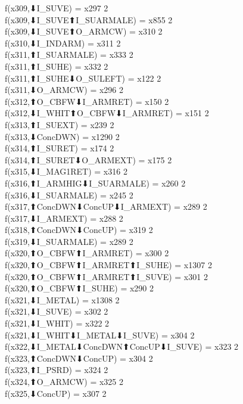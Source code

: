 f(x309,⬇I_SUVE) = x297 {2} \\
f(x309,⬇I_SUVE⬆I_SUARMALE) = x855 {2} \\
f(x309,⬇I_SUVE⬆O_ARMCW) = x310 {2} \\
f(x310,⬇I_INDARM) = x311 {2} \\
f(x311,⬆I_SUARMALE) = x333 {2} \\
f(x311,⬆I_SUHE) = x332 {2} \\
f(x311,⬆I_SUHE⬇O_SULEFT) = x122 {2} \\
f(x311,⬇O_ARMCW) = x296 {2} \\
f(x312,⬆O_CBFW⬇I_ARMRET) = x150 {2} \\
f(x312,⬇I_WHIT⬆O_CBFW⬇I_ARMRET) = x151 {2} \\
f(x313,⬆I_SUEXT) = x239 {2} \\
f(x313,⬇ConcDWN) = x1290 {2} \\
f(x314,⬆I_SURET) = x174 {2} \\
f(x314,⬆I_SURET⬇O_ARMEXT) = x175 {2} \\
f(x315,⬇I_MAG1RET) = x316 {2} \\
f(x316,⬆I_ARMHIG⬇I_SUARMALE) = x260 {2} \\
f(x316,⬇I_SUARMALE) = x245 {2} \\
f(x317,⬆ConcDWN⬇ConcUP⬇I_ARMEXT) = x289 {2} \\
f(x317,⬇I_ARMEXT) = x288 {2} \\
f(x318,⬆ConcDWN⬇ConcUP) = x319 {2} \\
f(x319,⬇I_SUARMALE) = x289 {2} \\
f(x320,⬆O_CBFW⬆I_ARMRET) = x300 {2} \\
f(x320,⬆O_CBFW⬆I_ARMRET⬆I_SUHE) = x1307 {2} \\
f(x320,⬆O_CBFW⬆I_ARMRET⬆I_SUVE) = x301 {2} \\
f(x320,⬆O_CBFW⬆I_SUHE) = x290 {2} \\
f(x321,⬇I_METAL) = x1308 {2} \\
f(x321,⬇I_SUVE) = x302 {2} \\
f(x321,⬇I_WHIT) = x322 {2} \\
f(x321,⬇I_WHIT⬇I_METAL⬇I_SUVE) = x304 {2} \\
f(x322,⬇I_METAL⬇ConcDWN⬆ConcUP⬇I_SUVE) = x323 {2} \\
f(x323,⬆ConcDWN⬇ConcUP) = x304 {2} \\
f(x323,⬆I_PSRD) = x324 {2} \\
f(x324,⬆O_ARMCW) = x325 {2} \\
f(x325,⬇ConcUP) = x307 {2} \\
